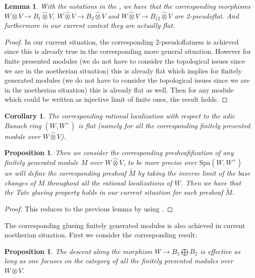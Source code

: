 \documentclass[12pt]{amsart}
\newtheorem{lemma}[theorem]{Lemma}
\newtheorem{proposition}[theorem]{Proposition}
\newtheorem{corollary}[theorem]{Corollary}
\theoremstyle{definition}
\numberwithin{equation}{section}
\begin{document}
\begin{lemma}
With the notations in the \cite[Lemma 2.4.10]{KL2}, we have that the corresponding morphisms $W\widehat{\otimes}V\rightarrow B_1\widehat{\otimes}V$, $W\widehat{\otimes}V\rightarrow B_2\widehat{\otimes}V$ and $W\widehat{\otimes}V\rightarrow B_{12}\widehat{\otimes}V$ are 2-pseudoflat. And furthermore in our current context they are actually flat.
\end{lemma}

\begin{proof}
In our current situation, the corresponding 2-pseudoflatness is achieved since this is already true in the corresponding more general situation. However for finite presented modules (we do not have to consider the topological issues since we are in the noetherian situation) this is already flat which implies for finitely generated modules (we do not have to consider the topological issues since we are in the noetherian situation) this is already flat	as well. Then for any module which could be written as injective limit of finite ones, the result holds. 
\end{proof}


\begin{corollary}
The corresponding rational localization with respect to the adic Banach ring $(W,W^+)$ is flat (namely for all the corresponding finitely presented module over $W\widehat{\otimes}V$).	
\end{corollary}

\begin{proposition}
Then we consider the corresponding presheafification of any finitely generated module $M$ over $W\widehat{\otimes}V$, to be more precise over $\mathrm{Spa}(W,W^+)$ we will define the corresponding presheaf $\widetilde{M}$ by taking the inverse limit of the base changes of $M$ throughout all the rational localizations of $W$. Then we have that the Tate glueing property holds in our current situation for such presheaf $\widetilde{M}$.
\end{proposition}


\begin{proof}
This reduces to the previous lemma by using \cite[Proposition 2.4.20, Proposition 2.4.21]{KL1}.	
\end{proof}


\indent The corresponding glueing finitely generated modules is also achieved in current noetherian situation. First we consider the corresponding result:

\begin{proposition}
The descent along the morphism $W\rightarrow B_1\bigoplus B_2$ is effective as long as one focuses on the category of all the finitely presented modules over $W\widehat{\otimes}V$. 	
\end{proposition}
\end{document}
